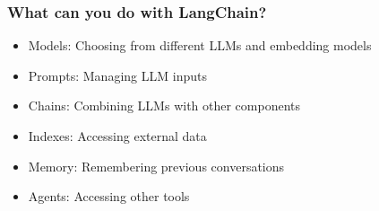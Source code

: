 \begin{frame}[fragile]
\begin{frame}[fragile]






\begin{frame}[fragile]\frametitle{What can you do with LangChain?}

\begin{itemize}
\item Models: Choosing from different LLMs and embedding models
\item Prompts: Managing LLM inputs
\item Chains: Combining LLMs with other components
\item Indexes: Accessing external data
\item Memory: Remembering previous conversations
\item Agents: Accessing other tools
\end{itemize}


\end{frame}
\end{frame}
\end{frame}
